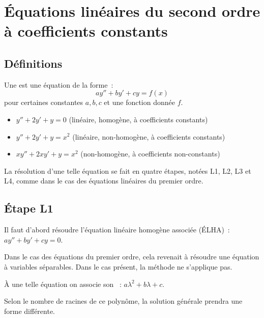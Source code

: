 \section{Équations linéaires du second ordre à coefficients constants}
\subsection{Définitions}
\begin{frame}
  \begin{definition}
    Une \pause{} est une équation de la forme~:
    \begin{equation*}
      a y'' + by' + c y = f(x)
    \end{equation*}\pause{}
    pour certaines constantes \(a,b,c\) et une fonction donnée \(f\).
  \end{definition}\pause{}

  \begin{example}
    \begin{itemize}
    \item \(y'' + 2 y' + y = 0\)\pause{} (linéaire,\pause{} homogène,\pause{} à coefficients constants)\pause{}
    \item \(y'' + 2 y' + y = x^{2}\)\pause{} (linéaire,\pause{} non-homogène,\pause{} à coefficients constants)\pause{}
    \item \(x y'' + 2 x y' + y = x^{2}\)\pause{} (non-homogène,\pause{} à coefficients non-constants)\pause{}
    \end{itemize}
  \end{example}

  La résolution d'une telle équation se fait en quatre étapes\pause{}, notées L1, L2, L3 et L4,\pause{} comme dans le cas des équations linéaires du premier ordre.
\end{frame}
\subsection{Étape L1}

\begin{frame}
  Il faut d'abord résoudre l'équation linéaire homogène associée (ÉLHA)~: \(a y'' + by' + cy = 0\). \pause{}

  \begin{remark*}
    Dans le cas des équations du premier ordre,\pause{} cela revenait à résoudre une équation à variables séparables.\pause{} Dans le cas présent, la méthode ne s'applique pas.
  \end{remark*}\pause{}

  À une telle équation on associe son ~:\pause{} \(a \lambda^{2}+ b\lambda + c\).\pause{}

  Selon le nombre de racines de ce polynôme,\pause{} la solution générale prendra une forme différente.
\end{frame}

